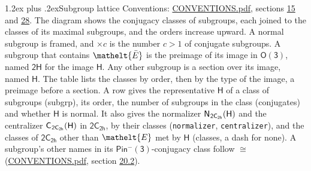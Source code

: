 \documentclass[10pt,a4paper]{article}
\makeatletter
\renewcommand\section{\@startsection{section}{1}{\z@}{-3ex plus -1ex minus -.2ex}%
  {1.2ex plus .2ex}{\normalfont\large\sffamily\bfseries\color{parttitle}}}
\numberwithin{equation}{section}
\newcommand{\eltfont}[1]{{\let\sigma\eltsigma\mathelt{#1}}}
\newcommand{\grp}[1]{\mathsf{#1}}
\newcommand{\cls}[1]{\eltfont{#1}}
\newcommand{\elt}[1]{\eltfont{#1}}
\newcommand{\samecls}{\cong}
\newcommand{\barred}[1]{\bar{#1}}
\newcommand{\secondclass}{\mathrm{b}}
\newcommand{\hairsp}{\mkern1mu}
\makeatother
\begin{document}
\section{Subgroup lattice}\label{s:subgroups}
Conventions: \href{../../CONVENTIONS.pdf}{CONVENTIONS.pdf}, sections \href{../../../rotation/CONVENTIONS.pdf\#conv.15}{15} and \href{../../CONVENTIONS.pdf\#conv.28}{28}.
The diagram shows the conjugacy classes of subgroups, each joined to the classes of its maximal subgroups, and the orders increase upward. \label{n:index.conjugates.c}A normal subgroup is framed, and ${\times}c$ is the number $c > 1$ of conjugate subgroups. \label{n:group.H}A subgroup that contains $\elt{\barred{E}}$ is the preimage of its image in $\grp{O(3)}$, named $\grp{2H}$ for the image $\grp{H}$. Any other subgroup is a section over its image, named $\grp{H}$. The table lists the classes by order, then by the type of the image, a preimage before a section. \label{n:head.subgroup}\label{n:head.order}\label{n:head.conjugates}\label{n:head.normal}A row gives the representative $\grp{H}$ of a class of subgroups (subgrp), its order, the number of subgroups in the class (conjugates) and whether $\grp{H}$ is normal. \label{n:group.normalizer}\label{n:group.centralizer}\label{n:head.classes}It also gives the normalizer $\grp{N}_{\hairsp \grp{2C_{2h}}}(\grp{H})$ and the centralizer $\grp{C}_{\hairsp \grp{2C_{2h}}}(\grp{H})$ in $\grp{2C_{2h}}$, by their classes (\texttt{normalizer}, \texttt{centralizer}), and the classes of $\grp{2C_{2h}}$ other than $\cls{E}$ met by $\grp{H}$ (classes, a dash for none). A subgroup's other names in its \href{Pinminus3.pdf}{$\grp{Pin^{-}(3)}$}-conjugacy class follow $\samecls$ (\href{../../CONVENTIONS.pdf}{CONVENTIONS.pdf}, section \href{../../CONVENTIONS.pdf\#conv.20.2}{20.2}).
\begin{center}
\end{center}
\end{document}
